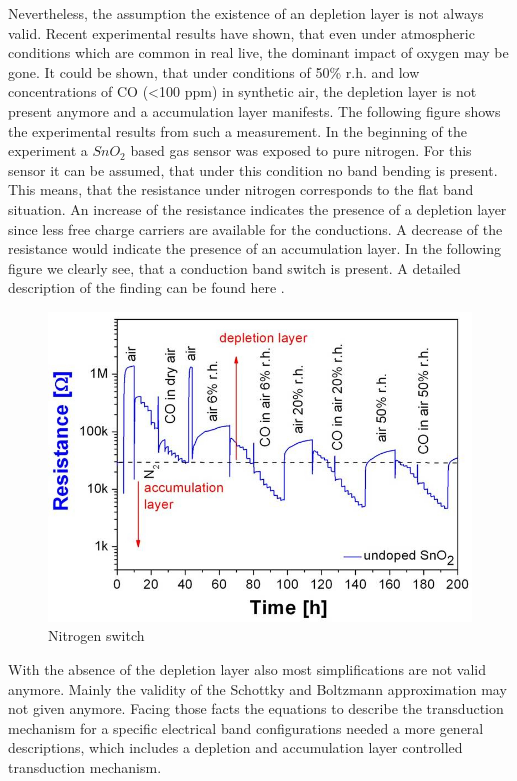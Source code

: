 \documentclass[11pt]{article}
\begin{document}
Nevertheless, the assumption the existence of an depletion layer is not
always valid. Recent experimental results have shown, that even under
atmospheric conditions which are common in real live, the dominant
impact of oxygen may be gone. It could be shown, that under conditions
of 50\% r.h. and low concentrations of CO (\textless100 ppm) in
synthetic air, the depletion layer is not present anymore and a
accumulation layer manifests. The following figure shows the
experimental results from such a measurement. In the beginning of the
experiment a \(SnO_2\) based gas sensor was exposed to pure nitrogen.
For this sensor it can be assumed, that under this condition no band
bending is present. This means, that the resistance under nitrogen
corresponds to the flat band situation. An increase of the resistance
indicates the presence of a depletion layer since less free charge
carriers are available for the conductions. A decrease of the resistance
would indicate the presence of an accumulation layer. In the following
figure we clearly see, that a conduction band switch is present. A
detailed description of the finding can be found here \cite{Barsan2015}.

\begin{figure}
\centering
\includegraphics{media/pics/external_plots/nitroline_switch_julia.jpg}
\caption{Nitrogen switch}
\end{figure}

    With the absence of the depletion layer also most simplifications are
not valid anymore. Mainly the validity of the Schottky and Boltzmann
approximation may not given anymore. Facing those facts the equations to
describe the transduction mechanism for a specific electrical band
configurations needed a more general descriptions, which includes a
depletion and accumulation layer controlled transduction mechanism.
\end{document}
